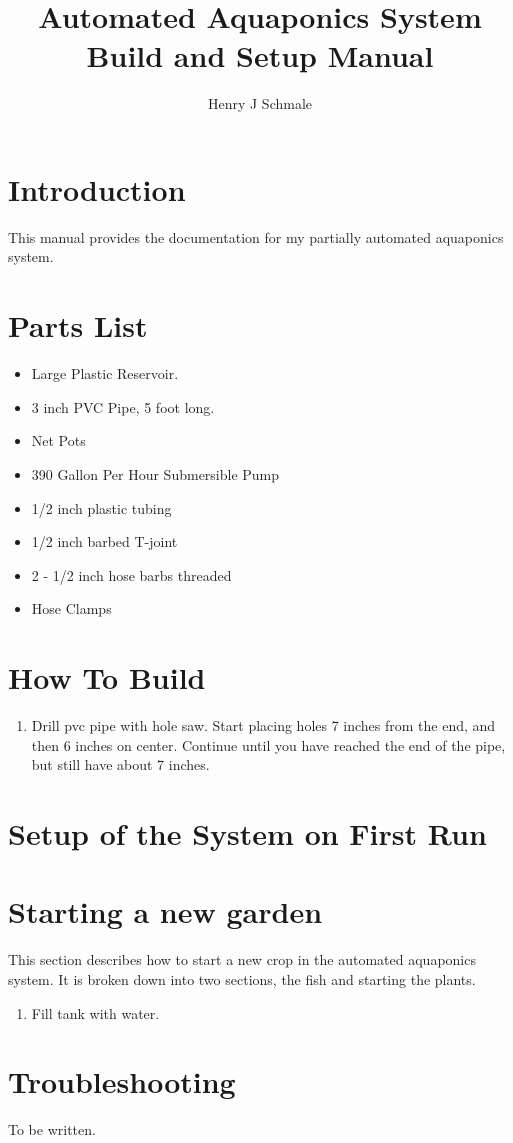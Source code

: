 \documentclass[american,doc,12pt]{apa6}
\title{Automated Aquaponics System Build and Setup Manual}
\author{Henry J Schmale}
\affiliation{Harrisburg University of Science and Technology}
\begin{document}
\maketitle
\tableofcontents

\section{Introduction}
This manual provides the documentation for my partially automated aquaponics
system.

\section{Parts List}
\begin{itemize}
	\item Large Plastic Reservoir.
	\item 3 inch PVC Pipe, 5 foot long.
	\item Net Pots
	\item 390 Gallon Per Hour Submersible Pump
	\item 1/2 inch plastic tubing
    \item 1/2 inch barbed T-joint
    \item 2 - 1/2 inch hose barbs threaded
    \item Hose Clamps
\end{itemize}


\section{How To Build}
\begin{enumerate}
	\item Drill pvc pipe with hole saw. Start placing holes 7 inches from the
		  end, and then 6 inches on center. Continue until you have reached
		  the end of the pipe, but still have about 7 inches.
\end{enumerate}


\section{Setup of the System on First Run}



\section{Starting a new garden}
This section describes how to start a new crop in the automated aquaponics
system. It is broken down into two sections, the fish and starting the plants.

\begin{enumerate}
	\item Fill tank with water.
\end{enumerate}



\section{Troubleshooting}
To be written.


\printbibliography
\end{document}
